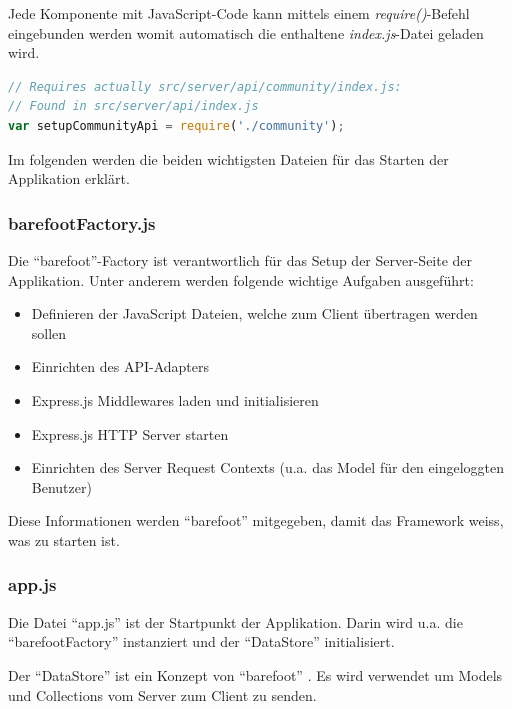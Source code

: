 Jede Komponente mit JavaScript-Code kann mittels einem \emph{require()}-Befehl eingebunden werden womit automatisch die enthaltene \emph{index.js}-Datei geladen wird.


\begin{lstlisting}[language=JavaScript, caption=Einbindung der Community-Komponente, float=ht!]
// Requires actually src/server/api/community/index.js:
// Found in src/server/api/index.js
var setupCommunityApi = require('./community');
\end{lstlisting}

Im folgenden werden die beiden wichtigsten Dateien für das Starten der Applikation erklärt.

\subsubsection*{barefootFactory.js}
Die ``barefoot''-Factory \cite{barefootFactoryjs} ist verantwortlich für das Setup der Server-Seite der Applikation.
Unter anderem werden folgende wichtige Aufgaben ausgeführt:
\begin{itemize}
	\item Definieren der JavaScript Dateien, welche zum Client übertragen werden sollen
	\item Einrichten des API-Adapters
	\item Express.js \cite{Expressjs} Middlewares laden und initialisieren
	\item Express.js \cite{Expressjs} HTTP Server starten
	\item Einrichten des Server Request Contexts (u.a. das Model für den eingeloggten Benutzer)
\end{itemize}

Diese Informationen werden ``barefoot'' \cite{Barefoot} mitgegeben, damit das Framework weiss, was zu starten ist.

\subsubsection*{app.js}
Die Datei ``app.js'' \cite{appjs} ist der Startpunkt der Applikation.
Darin wird u.a. die ``barefootFactory'' instanziert und der ``DataStore'' initialisiert.

Der ``DataStore'' ist ein Konzept von ``barefoot'' \cite{barefootDatastore}. Es wird verwendet um Models und Collections vom Server zum Client zu senden.
